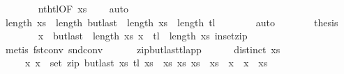 \begin{isabellebody}
\ \ \ \ \ \ \isamarkupfalse%
\ nth{\isacharunderscore}{\kern0pt}tl{\isacharbrackleft}{\kern0pt}OF\ {\isacartoucheopen}{\isacharquery}{\kern0pt}xs\ {\isasymnoteq}\ {\isacharbrackleft}{\kern0pt}{\isacharbrackright}{\kern0pt}{\isacartoucheclose}{\isacharbrackright}{\kern0pt}\ \isamarkupfalse%
\ auto\isanewline
\ \ \ \ \isamarkupfalse%
\ {\isachardoublequoteopen}{\isacharparenleft}{\kern0pt}length\ xs\ {\isacharless}{\kern0pt}\ length\ {\isacharquery}{\kern0pt}butlast{\isachardoublequoteclose}\ \ {\isachardoublequoteopen}{\isacharparenleft}{\kern0pt}length\ xs\ {\isacharless}{\kern0pt}\ length\ {\isacharquery}{\kern0pt}tl{\isachardoublequoteclose}\isanewline
\ \ \ \ \ \ \isamarkupfalse%
\ auto\isanewline
\ \ \ \ \isamarkupfalse%
\ \isamarkupfalse%
\ {\isacharquery}{\kern0pt}thesis\isanewline
\ \ \ \ \ \ \isamarkupfalse%
\ {\isacartoucheopen}x\ {\isacharequal}{\kern0pt}\ {\isacharquery}{\kern0pt}butlast\ {\isacharbang}{\kern0pt}\ {\isacharparenleft}{\kern0pt}length\ xs\ {\isacartoucheopen}x\ {\isacharequal}{\kern0pt}\ {\isacharquery}{\kern0pt}tl\ {\isacharbang}{\kern0pt}\ {\isacharparenleft}{\kern0pt}length\ xs\ in{\isacharunderscore}{\kern0pt}set{\isacharunderscore}{\kern0pt}zip\isanewline
\ \ \ \ \ \ \isamarkupfalse%
\ {\isacharparenleft}{\kern0pt}metis\ fst{\isacharunderscore}{\kern0pt}conv\ snd{\isacharunderscore}{\kern0pt}conv{\isacharparenright}{\kern0pt}\isanewline
\ \ \isamarkupfalse%
%
\endisatagproof
{\isafoldproof}%
%
\isadelimproof
\isanewline
%
\endisadelimproof
\isanewline
\ \ \isamarkupfalse%
\ zip{\isacharunderscore}{\kern0pt}butlast{\isacharunderscore}{\kern0pt}tl{\isacharunderscore}{\kern0pt}app{\isacharcolon}{\kern0pt}\ \isanewline
\ \ \ \ \ {\isachardoublequoteopen}distinct\ xs{\isachardoublequoteclose}\ \isanewline
\ \ \ \ \ {\isachardoublequoteopen}{\isacharparenleft}{\kern0pt}x\ x\ {\isasymin}\ set\ {\isacharparenleft}{\kern0pt}zip\ {\isacharparenleft}{\kern0pt}butlast\ xs{\isacharparenright}{\kern0pt}\ {\isacharparenleft}{\kern0pt}tl\ xs{\isacharparenright}{\kern0pt}{\isacharparenright}{\kern0pt}\ {\isasymlongleftrightarrow}\ {\isacharparenleft}{\kern0pt}{\isasymexists}xs\ xs\ xs\ {\isacharequal}{\kern0pt}\ xs\ {\isacharat}{\kern0pt}\ x\ {\isacharhash}{\kern0pt}\ x\ {\isacharhash}{\kern0pt}\ xs\isanewline

\end{isabellebody}
